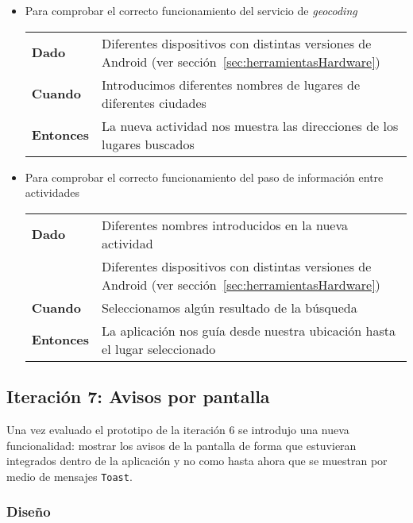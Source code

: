 \begin{itemize}
  \item Para comprobar el correcto funcionamiento del servicio de \emph{geocoding}

  \begin{tabular}{p{}p{}}
    \hline
    \textbf{Dado}     & Diferentes dispositivos con distintas versiones de Android (ver
                        sección~\ref{sec:herramientasHardware}) \\
    \textbf{Cuando}   & Introducimos diferentes nombres de lugares de diferentes ciudades \\
    \textbf{Entonces} & La nueva actividad nos muestra las direcciones de los lugares buscados \\
    \hline
  \end{tabular}

  \item Para comprobar el correcto funcionamiento del paso de información entre actividades

  \begin{tabular}{p{}p{}}
    \hline
    \textbf{Dado}     & Diferentes nombres introducidos en la nueva actividad \\
                      & Diferentes dispositivos con distintas versiones de Android (ver
                        sección~\ref{sec:herramientasHardware}) \\
    \textbf{Cuando}   & Seleccionamos algún resultado de la búsqueda \\
    \textbf{Entonces} & La aplicación nos guía desde nuestra ubicación hasta el lugar seleccionado\\
    \hline
  \end{tabular}
\end{itemize}

\subsection{Iteración 7: Avisos por pantalla}

Una vez evaluado el prototipo de la iteración 6 se introdujo una nueva funcionalidad: mostrar los
avisos de la pantalla de forma que estuvieran integrados dentro de la aplicación y no como hasta
ahora que se muestran por medio de mensajes \texttt{Toast}.

\subsubsection{Diseño}

